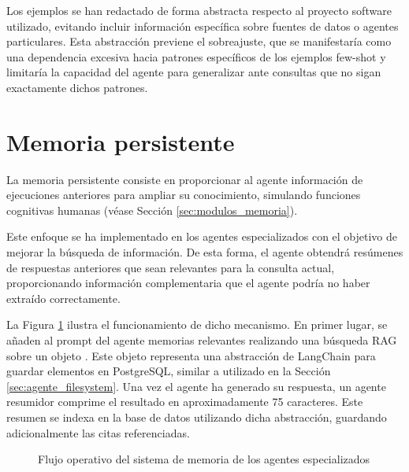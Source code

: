 Los ejemplos se han redactado de forma abstracta respecto al proyecto software utilizado, evitando incluir información específica sobre fuentes de datos o agentes particulares. Esta abstracción previene el sobreajuste, que se manifestaría como una dependencia excesiva hacia patrones específicos de los ejemplos few-shot y limitaría la capacidad del agente para generalizar ante consultas que no sigan exactamente dichos patrones.

\section{Memoria persistente}
La memoria persistente consiste en proporcionar al agente información de ejecuciones anteriores para ampliar su conocimiento, simulando funciones cognitivas humanas (véase Sección \ref{sec:modulos_memoria}).

Este enfoque se ha implementado en los agentes especializados con el objetivo de mejorar la búsqueda de información. De esta forma, el agente obtendrá resúmenes de respuestas anteriores que sean relevantes para la consulta actual, proporcionando información complementaria que el agente podría no haber extraído correctamente.

La Figura \ref{fig:mem_1} ilustra el funcionamiento de dicho mecanismo. En primer lugar, se añaden al prompt del agente memorias relevantes realizando una búsqueda RAG sobre un objeto . Este objeto representa una abstracción de LangChain para guardar elementos en PostgreSQL, similar a  utilizado en la Sección \ref{sec:agente_filesystem}. Una vez el agente ha generado su respuesta, un agente resumidor comprime el resultado en aproximadamente 75 caracteres. Este resumen se indexa en la base de datos utilizando dicha abstracción, guardando adicionalmente las citas referenciadas. 

\begin{figure}[h]
\centering
{}
\caption{Flujo operativo del sistema de memoria de los agentes especializados}
\label{fig:mem_1}
\end{figure}

